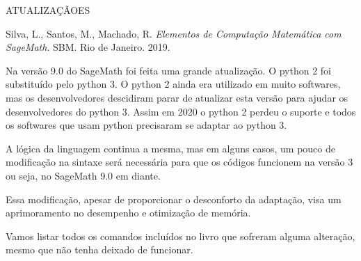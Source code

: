 \documentclass[12pt,a4paper]{report}
\begin{document}
\thispagestyle{empty}










\begin{center}
ATUALIZAÇÃOES 
\end{center}

\noindent
Silva, L., Santos, M., Machado, R. \textit{Elementos de Computação Matemática com SageMath}. SBM. Rio de Janeiro. 2019.



\vspace{1cm}


Na versão 9.0 do SageMath foi feita uma grande atualização. O python 2 foi substituído pelo python 3. O python 2 ainda era utilizado em muito softwares, mas os desenvolvedores descidiram parar de atualizar esta versão para ajudar os desenvolvedores do python 3. Assim em 2020 o python 2 perdeu o suporte e todos os softwares que usam python precisaram se adaptar ao python 3.

A lógica da linguagem continua a mesma, mas em alguns casos, um pouco de modificação na sintaxe será necessária para que os códigos funcionem na versão 3 ou seja, no SageMath 9.0 em diante.

Essa modificação, apesar de proporcionar o desconforto da adaptação, visa um aprimoramento no desempenho e otimização de memória. 

Vamos listar todos os comandos incluídos no livro que sofreram alguma alteração, mesmo que não tenha deixado de funcionar.
\end{document}
